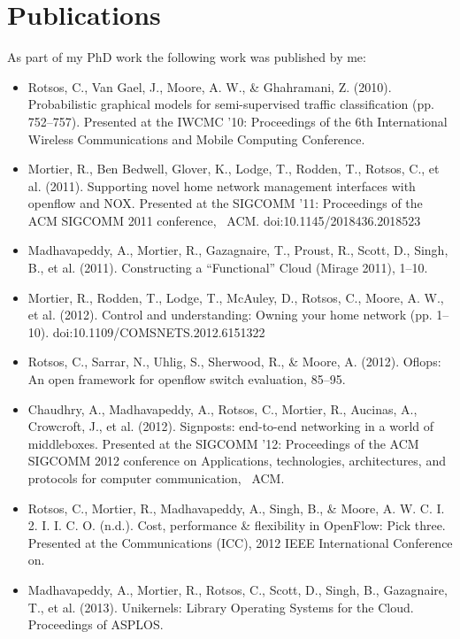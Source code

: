 \section{Publications} \label{sec:intro:pubs}
As part of my PhD work the following work was published by me:
\begin{itemize}
  \item Rotsos, C., Van Gael, J., Moore, A. W., \& Ghahramani, Z. (2010).
        Probabilistic graphical models for semi-supervised traffic
        classification (pp. 752–757). Presented at the IWCMC '10: Proceedings of
        the 6th International Wireless Communications and Mobile Computing
        Conference.
  \item Mortier, R., Ben Bedwell, Glover, K., Lodge, T., Rodden, T., Rotsos, C.,
        et al. (2011). Supporting novel home network management interfaces with
        openflow and NOX. Presented at the SIGCOMM '11: Proceedings of the ACM
        SIGCOMM 2011 conference,  ACM. doi:10.1145/2018436.2018523
  \item Madhavapeddy, A., Mortier, R., Gazagnaire, T., Proust, R., Scott, D.,
        Singh, B., et al. (2011). Constructing a “Functional” Cloud (Mirage
        2011), 1–10.
  \item Mortier, R., Rodden, T., Lodge, T., McAuley, D., Rotsos, C., Moore, A.
        W., et al. (2012). Control and understanding: Owning your home network
        (pp. 1–10). doi:10.1109/COMSNETS.2012.6151322
  \item Rotsos, C., Sarrar, N., Uhlig, S., Sherwood, R., \& Moore, A. (2012).
        Oflops: An open framework for openflow switch evaluation, 85–95.
  \item Chaudhry, A., Madhavapeddy, A., Rotsos, C., Mortier, R., Aucinas, A.,
        Crowcroft, J., et al. (2012). Signposts: end-to-end networking in a
        world of middleboxes. Presented at the SIGCOMM '12: Proceedings of the
        ACM SIGCOMM 2012 conference on Applications, technologies,
        architectures, and protocols for computer communication,  ACM.
  \item Rotsos, C., Mortier, R., Madhavapeddy, A., Singh, B., \& Moore, A. W. C.
        I. 2. I. I. C. O. (n.d.). Cost, performance \& flexibility in OpenFlow:
        Pick three. Presented at the Communications (ICC), 2012 IEEE
        International Conference on.
  \item Madhavapeddy, A., Mortier, R., Rotsos, C., Scott, D., Singh, B.,
        Gazagnaire, T., et al. (2013). Unikernels: Library Operating Systems for
        the Cloud. Proceedings of ASPLOS.  
\end{itemize}



